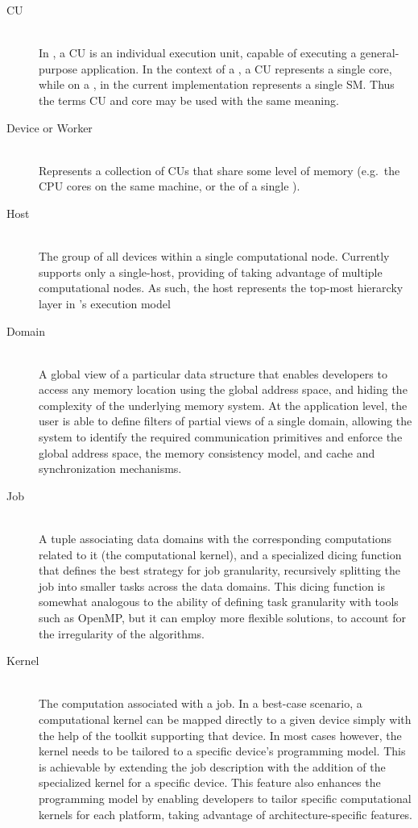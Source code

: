 \documentclass[main.tex]{subfiles}
\begin{document}
\begin{description}
  \item[\acf{CU}] \hfill \\
    In \gama, a \acl{CU} is an individual execution unit, capable of executing a general-purpose application. In the context of a \cpu, a \acl{CU} represents a single core, while on a \gpu, in the current implementation represents a single \acf{SM}. Thus the terms \ac{CU} and core may be used with the same meaning.

  \item[Device or Worker] \hfill \\
    Represents a collection of \aclp{CU} that share some level of memory (e.g.\ the CPU cores on the same machine, or the \sms  of a single \gpu).

  \item[Host] \hfill \\
    The group of all devices within a single computational node. Currently \gama supports only a single-host, providing of taking advantage of multiple computational nodes. As such, the host represents the top-most hierarcky layer in \gama's execution model

  \item[Domain] \hfill \\
    A global view of a particular data structure that enables developers to access any memory location using the global address space, and hiding the complexity of the underlying memory system. At the application level, the user is able to define filters of partial views of a single domain, allowing the system to identify the required communication primitives and enforce the global address space, the memory consistency model, and cache and synchronization mechanisms.

  \item[Job] \hfill \\
    A tuple associating data domains with the corresponding computations related to it (the computational kernel), and a specialized dicing function that defines the best strategy for job granularity, recursively splitting the job into smaller tasks across the data domains. This dicing function is somewhat analogous to the ability of defining task granularity with tools such as \acs{OpenMP}, but it can employ more flexible solutions, to account for the irregularity of the algorithms.

  \item[Kernel] \hfill \\
    The computation associated with a job. In a best-case scenario, a computational kernel can be mapped directly to a given device simply with the help of the toolkit supporting that device. In most cases however, the kernel needs to be tailored to a specific device's programming model. This is achievable by extending the job description with the addition of the specialized kernel for a specific device. This feature also enhances the programming model by enabling developers to tailor specific computational kernels for each platform, taking advantage of architecture-specific features.


\end{description}
\end{document}
